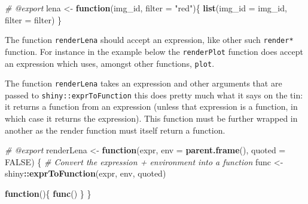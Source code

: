 \documentclass[
]{krantz}
\makeatletter
\newenvironment{Shaded}{\begin{snugshade}}{\end{snugshade}}
\newcommand{\CommentTok}[1]{\textcolor[rgb]{0.37,0.37,0.37}{\textit{#1}}}
\newcommand{\ControlFlowTok}[1]{\textcolor[rgb]{0.27,0.27,0.27}{\textbf{#1}}}
\newcommand{\DataTypeTok}[1]{\textcolor[rgb]{0.27,0.27,0.27}{#1}}
\newcommand{\KeywordTok}[1]{\textcolor[rgb]{0.27,0.27,0.27}{\textbf{#1}}}
\newcommand{\NormalTok}[1]{#1}
\newcommand{\OperatorTok}[1]{\textcolor[rgb]{0.43,0.43,0.43}{\textbf{#1}}}
\newcommand{\OtherTok}[1]{\textcolor[rgb]{0.37,0.37,0.37}{#1}}
\newcommand{\StringTok}[1]{\textcolor[rgb]{0.5,0.5,0.5}{#1}}
\newenvironment{kframe}{%
\medskip{}
\setlength{\fboxsep}{.8em}
 \def\at@end@of@kframe{}%
 \ifinner\ifhmode%
  \def\at@end@of@kframe{\end{minipage}}%
  \begin{minipage}{\columnwidth}%
 \fi\fi%
 \def\FrameCommand##1{\hskip\@totalleftmargin \hskip-\fboxsep
 \colorbox{shadecolor}{##1}\hskip-\fboxsep
     \hskip-\linewidth \hskip-\@totalleftmargin \hskip\columnwidth}%
 \MakeFramed {\advance\hsize-\width
   \@totalleftmargin\z@ \linewidth\hsize
   \@setminipage}}%
 {\par\unskip\endMakeFramed%
 \at@end@of@kframe}
\renewenvironment{Shaded}{\begin{kframe}}{\end{kframe}}
\makeatother
\begin{document}
\begin{Shaded}
\begin{Highlighting}[]
\CommentTok{\#\textquotesingle{} @export}
\NormalTok{lena <{-}}\StringTok{ }\ControlFlowTok{function}\NormalTok{(img\_id, }\DataTypeTok{filter =} \StringTok{"red"}\NormalTok{)\{}
  \KeywordTok{list}\NormalTok{(}\DataTypeTok{img\_id =}\NormalTok{ img\_id, }\DataTypeTok{filter =}\NormalTok{ filter)}
\NormalTok{\}}
\end{Highlighting}
\end{Shaded}

The function \texttt{renderLena} should accept an expression, like other such \texttt{render*} function. For instance in the example below the \texttt{renderPlot} function does accept an expression which uses, amongst other functions, \texttt{plot}.

\begin{Shaded}
\end{Shaded}

The function \texttt{renderLena} takes an expression and other arguments that are passed to \texttt{shiny::exprToFunction} this does pretty much what it says on the tin: it returns a function from an expression (unless that expression is a function, in which case it returns the expression). This function must be further wrapped in another as the render function must itself return a function.

\begin{Shaded}
\begin{Highlighting}[]
\CommentTok{\#\textquotesingle{} @export}
\NormalTok{renderLena <{-}}\StringTok{ }\ControlFlowTok{function}\NormalTok{(expr, }\DataTypeTok{env =} \KeywordTok{parent.frame}\NormalTok{(), }\DataTypeTok{quoted =} \OtherTok{FALSE}\NormalTok{) \{}
  \CommentTok{\# Convert the expression + environment into a function}
\NormalTok{  func <{-}}\StringTok{ }\NormalTok{shiny}\OperatorTok{::}\KeywordTok{exprToFunction}\NormalTok{(expr, env, quoted)}

  \ControlFlowTok{function}\NormalTok{()\{}
    \KeywordTok{func}\NormalTok{()}
\NormalTok{  \}}
\NormalTok{\}}
\end{Highlighting}
\end{Shaded}
\end{document}
